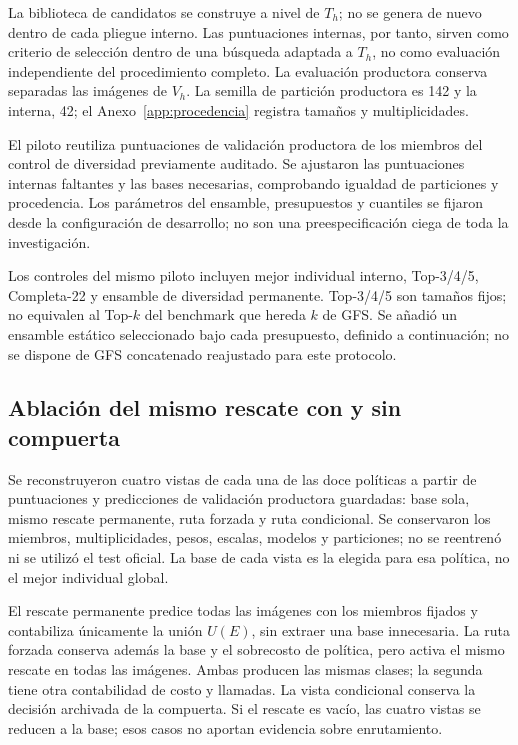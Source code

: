 La biblioteca de candidatos se construye a nivel de $T_h$; no se genera de nuevo dentro de cada pliegue interno. Las puntuaciones internas, por tanto, sirven como criterio de selección dentro de una búsqueda adaptada a $T_h$, no como evaluación independiente del procedimiento completo. La evaluación productora conserva separadas las imágenes de $V_h$. La semilla de partición productora es 142 y la interna, 42; el Anexo~\ref{app:procedencia} registra tamaños y multiplicidades.

El piloto reutiliza puntuaciones de validación productora de los miembros del control de diversidad previamente auditado. Se ajustaron las puntuaciones internas faltantes y las bases necesarias, comprobando igualdad de particiones y procedencia. Los parámetros del ensamble, presupuestos y cuantiles se fijaron desde la configuración de desarrollo; no son una preespecificación ciega de toda la investigación.

Los controles del mismo piloto incluyen mejor individual interno, Top-3/4/5, Completa-22 y ensamble de diversidad permanente. Top-3/4/5 son tamaños fijos; no equivalen al Top-$k$ del benchmark que hereda $k$ de GFS. Se añadió un ensamble estático seleccionado bajo cada presupuesto, definido a continuación; no se dispone de GFS concatenado reajustado para este protocolo.

\subsection{Ablación del mismo rescate con y sin compuerta}\label{sec:diseno-p0}
Se reconstruyeron cuatro vistas de cada una de las doce políticas a partir de puntuaciones y predicciones de validación productora guardadas: base sola, mismo rescate permanente, ruta forzada y ruta condicional. Se conservaron los miembros, multiplicidades, pesos, escalas, modelos y particiones; no se reentrenó ni se utilizó el test oficial. La base de cada vista es la elegida para esa política, no el mejor individual global.

El rescate permanente predice todas las imágenes con los miembros fijados y contabiliza únicamente la unión $U(E)$, sin extraer una base innecesaria. La ruta forzada conserva además la base y el sobrecosto de política, pero activa el mismo rescate en todas las imágenes. Ambas producen las mismas clases; la segunda tiene otra contabilidad de costo y llamadas. La vista condicional conserva la decisión archivada de la compuerta. Si el rescate es vacío, las cuatro vistas se reducen a la base; esos casos no aportan evidencia sobre enrutamiento.

